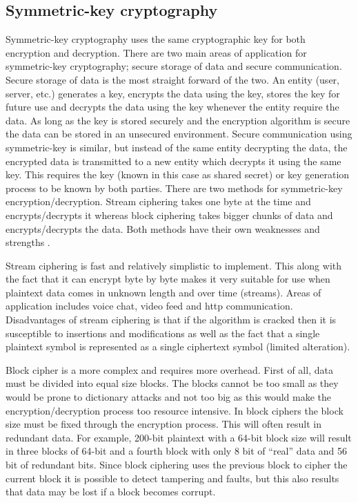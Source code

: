 \subsection{Symmetric-key cryptography}
\label{sec:symmetricCrypto}
Symmetric-key cryptography uses the same cryptographic key for both encryption and decryption. There are two main areas of application for symmetric-key cryptography; secure storage of data and secure communication. Secure storage of data is the most straight forward of the two. An entity (user, server, etc.) generates a key, encrypts the data using the key, stores the key for future use and decrypts the data using the key whenever the entity require the data. As long as the key is stored securely and the encryption algorithm is secure the data can be stored in an unsecured environment. Secure communication using symmetric-key is similar, but instead of the same entity decrypting the data, the encrypted data is transmitted to a new entity which decrypts it using the same key. This requires the key (known in this case as shared secret) or key generation process to be known by both parties. There are two methods for symmetric-key encryption/decryption. Stream ciphering takes one byte at the time and encrypts/decrypts it whereas block ciphering takes bigger chunks of data and encrypts/decrypts the data. Both methods have their own weaknesses and strengths \cite[~Ch. 2.1.1]{cryptoMath}.

Stream ciphering is fast and relatively simplistic to implement. This along with the fact that it can encrypt byte by byte makes it very suitable for use when plaintext data comes in  unknown length and over time (streams). Areas of application includes voice chat, video feed and http communication. Disadvantages of stream ciphering is that if the algorithm is cracked then it is susceptible to insertions and modifications as well as the fact that a single plaintext symbol is represented as a single ciphertext symbol (limited alteration).

Block cipher is a more complex and requires more overhead. First of all, data must be divided into equal size blocks. The blocks cannot be too small as they would be prone to dictionary attacks and not too big as this would make the encryption/decryption process too resource intensive. In block ciphers the block size must be fixed through the encryption process. This will often result in redundant data. For example, 200-bit plaintext with a 64-bit block size will result in three blocks of 64-bit and a fourth block with only 8 bit of ``real'' data and 56 bit of redundant bits. Since block ciphering uses the previous block to cipher the current block it is possible to detect tampering and faults, but this also results that data may be lost if a block becomes corrupt.

